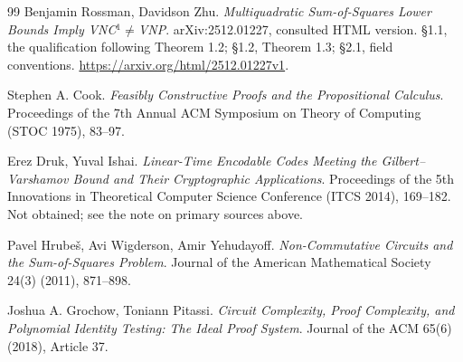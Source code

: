 \documentclass[11pt]{article}
\theoremstyle{definition}
\theoremstyle{remark}
\begin{document}
\begin{thebibliography}{99}
 Benjamin Rossman, Davidson Zhu.
\emph{Multiquadratic Sum-of-Squares Lower Bounds Imply
VNC$^1\ne$VNP}. arXiv:2512.01227, consulted HTML version.
\S1.1, the qualification following Theorem 1.2;
\S1.2, Theorem 1.3; \S2.1, field conventions.
\url{https://arxiv.org/html/2512.01227v1}.

 Stephen A. Cook.
\emph{Feasibly Constructive Proofs and the Propositional Calculus}.
Proceedings of the 7th Annual ACM Symposium on Theory of Computing
(STOC 1975), 83--97.

 Erez Druk, Yuval Ishai.
\emph{Linear-Time Encodable Codes Meeting the Gilbert--Varshamov
Bound and Their Cryptographic Applications}. Proceedings of the 5th
Innovations in Theoretical Computer Science Conference (ITCS 2014),
169--182. Not obtained; see the note on primary sources above.

 Pavel Hrube\v{s}, Avi Wigderson, Amir Yehudayoff.
\emph{Non-Commutative Circuits and the Sum-of-Squares Problem}.
Journal of the American Mathematical Society 24(3) (2011), 871--898.

 Joshua A. Grochow, Toniann Pitassi.
\emph{Circuit Complexity, Proof Complexity, and Polynomial Identity
Testing: The Ideal Proof System}. Journal of the ACM 65(6) (2018),
Article 37.
\end{thebibliography}
\end{document}
